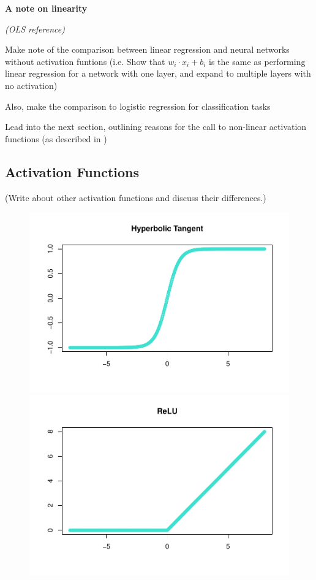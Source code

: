 \textbf{A note on linearity}

\textit{(OLS reference)}

Make note of the comparison between linear regression and neural networks without activation funtions (i.e. Show that $w_i \cdot x_i + b_i$ is the same as performing linear regression for a network with one layer, and expand to multiple layers with no activation)

Also, make the comparison to logistic regression for classification tasks

Lead into the next section, outlining reasons for the call to non-linear activation functions (as described in \cite{sharma2017activation})


\hypertarget{activation-functions}{%
\subsection{Activation Functions}\label{activation-functions}}

(Write about other activation functions and discuss their differences.)

\begin{figure}[H]
    \includegraphics[width=0.5\linewidth]{Figures/other-activation-functions-1.pdf}
    \includegraphics[width=0.5\linewidth]{Figures/other-activation-functions-2.pdf}
    \vspace{-40pt}
\end{figure}


